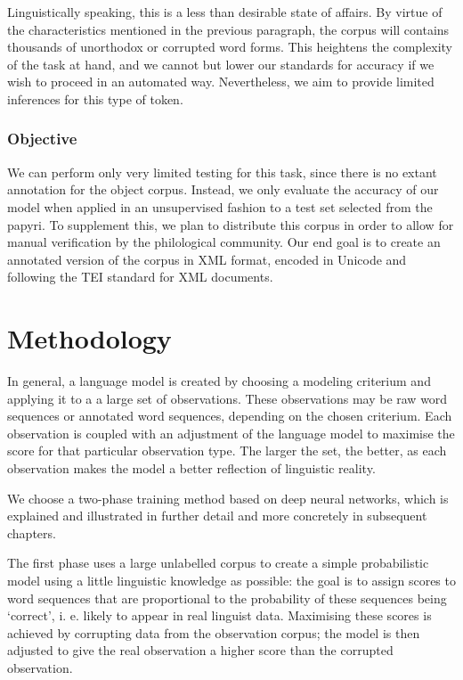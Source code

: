 Linguistically speaking, this is a less than desirable state of
affairs. By virtue of the characteristics mentioned in the previous
paragraph, the corpus will contains thousands of unorthodox or
corrupted word forms. This heightens the complexity of the task at
hand, and we cannot but lower our standards for accuracy if we wish to
proceed in an automated way. Nevertheless, we aim to provide
limited inferences for this type of token.

\subsubsection{Objective}
We can perform only very limited testing for this task, since there is
no extant annotation for the object corpus. Instead, we only evaluate
the accuracy of our model when applied in an unsupervised fashion to a
test set selected from the papyri. To supplement this, we plan to
distribute this corpus in order to allow for manual verification by
the philological community. Our end goal is to create an annotated
version of the corpus in XML format, encoded in Unicode and following
the TEI standard for XML documents.

\section{Methodology}
In general, a language model is created by choosing a modeling
criterium and applying it to a a large set of observations. These
observations may be raw word sequences or annotated word sequences,
depending on the chosen criterium. Each observation is coupled with an
adjustment of the language model to maximise the score for that
particular observation type. The larger the set, the better, as each
observation makes the model a better reflection of linguistic reality.

We choose a two-phase training method based on deep neural networks,
which is explained and illustrated in further detail and more
concretely in subsequent chapters.

The first phase uses a large unlabelled corpus to create a simple
probabilistic model using a little linguistic knowledge as possible:
the goal is to assign scores to word sequences that are proportional
to the probability of these sequences being `correct', i. e. likely to
appear in real linguist data. Maximising these scores is achieved by
corrupting data from the observation corpus; the model is then
adjusted to give the real observation a higher score than the
corrupted observation.

